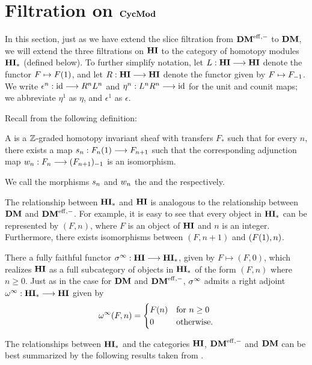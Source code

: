 \newpage
\section{Filtration on $\CycMod$}\label{sect_filtration_cycmod}

In this section, just as we have extend the slice filtration from
$\DMeff$ to $\DM$, we will extend the three filtrations on
$\HI$ to the category of homotopy modules $\HM$ (defined below).
To further simplify notation, let $L: \HI \to \HI$ denote the 
functor $F \mapsto \LHI{F}$, and let $R: \HI \to \HI$ denote the 
functor given by $F \mapsto \RHI{F}$. We write $\epsilon^n : \id 
\to R^nL^n$ and $\eta^n: L^nR^n \to \id$ for the unit and counit 
maps; we abbreviate $\eta^1$ as $\eta$, and $\epsilon^1$ as 
$\epsilon$.

Recall from \cite[1.17]{DegModHom} the following definition:

\begin{defn}\label{def_hm}
A  is a $\Z$-graded homotopy 
invariant sheaf with transfers $F_*$ such that for every $n$, 
there exists a map $\susp_n: \LHI{F_n} \to F_{n+1}$ such that the 
corresponding adjunction map $\deloop_n: F_n \to \RHI{(F_{n+1})}$
is an isomorphism.

We call the morphisms $\susp_n$ and $\deloop_n$ the  and the  respectively.
\end{defn}

The relationship between $\HM$ and $\HI$ is analogous to the 
relationship between $\DM$ and $\DMeff$. For example, it is easy 
to see that every object in $\HM$ can be represented by $(F, n)$, 
where $F$ is an object of $\HI$ and $n$ is an integer. 
Furthermore, there exists isomorphisms between $(F, n + 1)$ and
$(\LHI{F}, n)$. 

There a fully faithful functor $\spectHI : \HI \to \HM$, given by 
$F \mapsto (F, 0)$, which realizes $\HI$ as a full subcategory of 
objects in $\HM$ of the form $(F, n)$ where $n \geq 0$. Just as in
the case for $\DM$ and $\DMeff$, $\spectHI$ admits a right adjoint
$\loopHM : \HM \to \HI$ given by 
\[
\loopHM(F, n) = \begin{cases}
\LHI[n]F &\textrm{for }n \geq 0\\
0 &\textrm{otherwise}.
\end{cases}
\]

The relationships between $\HM$ and the categories $\HI$, $\DMeff$ 
and $\DM$ can be best summarized by the following results taken
from \cite{DegModHom}.

